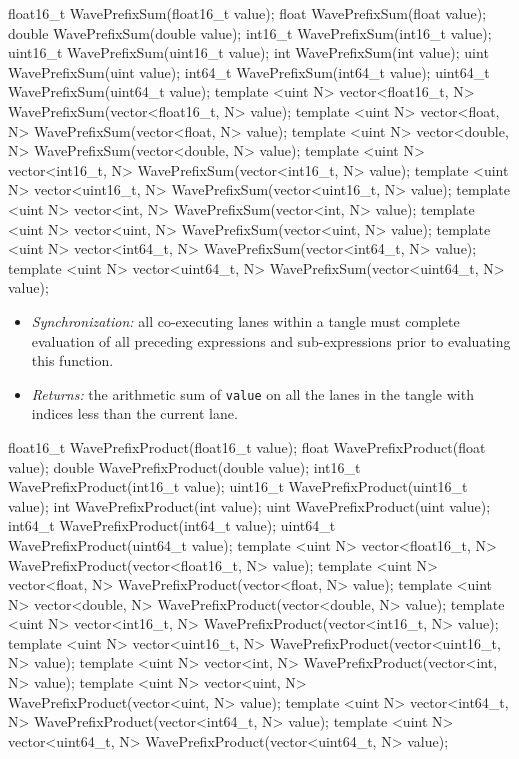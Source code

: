 \begin{HLSL}
float16_t WavePrefixSum(float16_t value);
float WavePrefixSum(float value);
double WavePrefixSum(double value);
int16_t WavePrefixSum(int16_t value);
uint16_t WavePrefixSum(uint16_t value);
int WavePrefixSum(int value);
uint WavePrefixSum(uint value);
int64_t WavePrefixSum(int64_t value);
uint64_t WavePrefixSum(uint64_t value);
template <uint N> vector<float16_t, N> WavePrefixSum(vector<float16_t, N> value);
template <uint N> vector<float, N> WavePrefixSum(vector<float, N> value);
template <uint N> vector<double, N> WavePrefixSum(vector<double, N> value);
template <uint N> vector<int16_t, N> WavePrefixSum(vector<int16_t, N> value);
template <uint N> vector<uint16_t, N> WavePrefixSum(vector<uint16_t, N> value);
template <uint N> vector<int, N> WavePrefixSum(vector<int, N> value);
template <uint N> vector<uint, N> WavePrefixSum(vector<uint, N> value);
template <uint N> vector<int64_t, N> WavePrefixSum(vector<int64_t, N> value);
template <uint N> vector<uint64_t, N> WavePrefixSum(vector<uint64_t, N> value);
\end{HLSL}

\begin{itemize}
  \item \textit{Synchronization:} all co-executing \gls{lane}s within a \gls{tangle}
  must complete evaluation of all preceding expressions and sub-expressions
  prior to evaluating this function.
  \item \textit{Returns:} the arithmetic sum of \texttt{value} on all the
  \gls{lane}s in the \gls{tangle} with indices less than the current \gls{lane}.
\end{itemize}

\begin{HLSL}
float16_t WavePrefixProduct(float16_t value);
float WavePrefixProduct(float value);
double WavePrefixProduct(double value);
int16_t WavePrefixProduct(int16_t value);
uint16_t WavePrefixProduct(uint16_t value);
int WavePrefixProduct(int value);
uint WavePrefixProduct(uint value);
int64_t WavePrefixProduct(int64_t value);
uint64_t WavePrefixProduct(uint64_t value);
template <uint N> vector<float16_t, N> WavePrefixProduct(vector<float16_t, N> value);
template <uint N> vector<float, N> WavePrefixProduct(vector<float, N> value);
template <uint N> vector<double, N> WavePrefixProduct(vector<double, N> value);
template <uint N> vector<int16_t, N> WavePrefixProduct(vector<int16_t, N> value);
template <uint N> vector<uint16_t, N> WavePrefixProduct(vector<uint16_t, N> value);
template <uint N> vector<int, N> WavePrefixProduct(vector<int, N> value);
template <uint N> vector<uint, N> WavePrefixProduct(vector<uint, N> value);
template <uint N> vector<int64_t, N> WavePrefixProduct(vector<int64_t, N> value);
template <uint N> vector<uint64_t, N> WavePrefixProduct(vector<uint64_t, N> value);
\end{HLSL}


